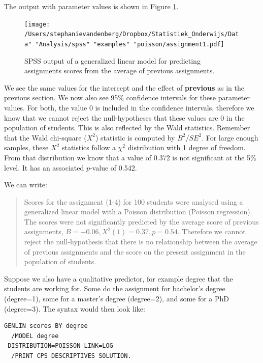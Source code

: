\documentclass[]{book}\usepackage[]{graphicx}\usepackage[]{color}
\begin{document}
The output with parameter values is shown in Figure \ref{fig:assignment1}.


\begin{figure}[h]
    \begin{center}
       \texttt{[image: /Users/stephanievandenberg/Dropbox/Statistiek\_Onderwijs/Data" "Analysis/spss" "examples" "poisson/assignment1.pdf]}
    \end{center}
     \caption{SPSS output of a generalized linear model for predicting assignments scores from the average of previous assignments.}
    \label{fig:assignment1}
\end{figure}


We see the same values for the intercept and the effect of \textbf{previous} as in the previous section. We now also see 95\% confidence intervals for these parameter values. For both, the value 0 is included in the confidence intervals, therefore we know that we cannot reject the null-hypotheses that these values are 0 in the population of students. This is also reflected by the Wald statistics. Remember that the Wald chi-square ($X^2$) statistic is computed by $B^2/SE^2$. For large enough samples, these $X^2$ statistics follow a $\chi^2$ distribution with 1 degree of freedom. From that distribution we know that a value of 0.372 is not significant at the 5\% level. It has an associated $p$-value of 0.542.

We can write:

\begin{quotation}
Scores for the assignment (1-4) for 100 students were analysed using a generalized linear model with a Poisson distribution (Poisson regression). The scores were not significantly predicted by the average score of previous assignments, $B=-0.06, X^2(1)=0.37, p=0.54$. Therefore we cannot reject the null-hypothesis that there is no relationship between the average of previous assignments and the score on the present assignment in the population of students.
\end{quotation}



Suppose we also have a qualitative predictor, for example degree that the students are working for. Some do the assignment for bachelor's degree (degree=1), some for a master's degree (degree=2), and some for a PhD (degree=3). The syntax would then look like:


\begin{verbatim}
GENLIN scores BY degree
  /MODEL degree
 DISTRIBUTION=POISSON LINK=LOG
  /PRINT CPS DESCRIPTIVES SOLUTION.
\end{verbatim}
\end{document}

